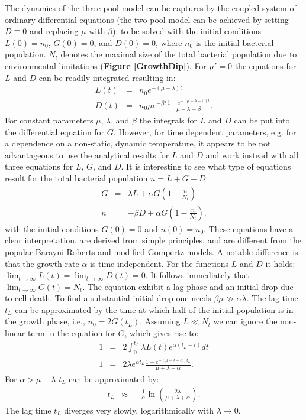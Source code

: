 \documentclass[10pt,A4paper]{article}
\begin{document}
The dynamics of the three pool model can be captures by the coupled system of ordinary differential equations (the two pool model can be achieved by setting $D\equiv 0$ and replacing $\mu$ with $\beta$):
to be solved with the initial conditions $L(0)=n_0$, $G(0)=0$, and $D(0)=0$, where $n_0$ is the initial bacterial population. 
$N_t$ denotes the maximal size of the total bacterial population due to environmental limitations (\textbf{Figure \ref{GrowthDip}}). 
For $\mu'=0$ the equations for $L$ and $D$ can be readily integrated resulting in:
\begin{eqnarray}
L(t) &=& n_0 e^{-(\mu+\lambda)t}\\
D(t) &=& n_0 \mu e^{-\beta t}\frac{1-e^{-(\mu+\lambda-\beta)t}}{\mu+\lambda-\beta}.
\end{eqnarray}
For constant parameters $\mu$, $\lambda$, and $\beta$ the integrals for $L$ and $D$ can be put into the differential equation for $G$. 
However, for time dependent parameters, e.g. for a dependence on a non-static, dynamic temperature, it appears to be not advantageous to use the analytical results for $L$ and $D$ and work instead with all three equations for $L$, $G$, and $D$. 
It is interesting to see what type of equations result for the total bacterial population $n=L+G+D$:
\begin{eqnarray}
\dot{G} &=& \lambda L + \alpha G\left(1-\frac{n}{N_t}\right)\\
\dot{n} &=& - \beta D + \alpha G\left(1-\frac{n}{N_t}\right). 
\end{eqnarray}
with the initial conditions $G(0)=0$ and $n(0)=n_0$. 
These equations have a clear interpretation, are derived from simple principles, and are different from the popular Barayni-Roberts and modified-Gompertz models. 
A notable difference is that the growth rate $\alpha$ is time independent. 
For the functions $L$ and $D$ it holds: $\lim_{t\to\infty} L(t) = \lim_{t\to\infty} D(t) = 0$. 
It follows immediately that $\lim_{t\to\infty} G(t) = N_t$. 
The equation exhibit a lag phase and an initial drop due to cell death. 
To find a substantial initial drop one needs $\beta \mu \gg \alpha \lambda$. 
The lag time $t_L$ can be approximated by the time at which half of the initial population is in the growth phase, i.e., $n_0=2G(t_L)$. 
Assuming $L\ll N_t$ we can ignore the non-linear term in the equation for $G$, which gives rise to:
\begin{eqnarray}
1&=& 2\int_0^{t_L} \lambda L(t)e^{\alpha(t_L-t)}dt\\
1  &=& 2\lambda e^{\alpha t_L}\frac{1-e^{-(\mu+\lambda+\alpha)t_L}}{\mu+\lambda+\alpha}.
\end{eqnarray}
For $\alpha > \mu+\lambda$ $t_L$ can be approximated by:
\begin{eqnarray}
t_L &\approx& -\frac{1}{\alpha}\ln\left(\frac{2\lambda}{\mu+\lambda+\alpha}\right).
\end{eqnarray}
The lag time $t_L$ diverges very slowly, logarithmically with $\lambda\to 0$.
\end{document}
